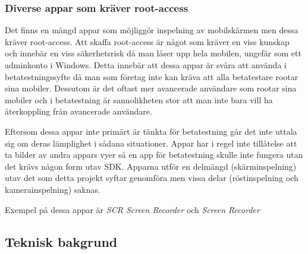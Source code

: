 \subsubsection{Diverse appar som kräver root-access}
\label{rootacc}
Det finns en mängd appar som möjliggör inspelning av mobilskärmen men dessa kräver root-access. Att skaffa root-access är något som kräver en viss kunskap och innebär en viss säkerhetsrisk då man låser upp hela mobilen, ungefär som ett adminkonto i Windows. Detta innebär att dessa appar är svåra att använda i betatestningssyfte då man som företag inte kan kräva att alla betatestare rootar sina mobiler. Dessutom är det oftast mer avancerade användare som rootar sina mobiler och i betatestning är sannolikheten stor att man inte bara vill ha återkoppling från avancerade användare. 

Eftersom dessa appar inte primärt är tänkta för betatestning går det inte uttala sig om deras lämplighet i sådana situationer. Appar har i regel inte tillåtelse att ta bilder av andra appars vyer så en app för betatestning skulle inte fungera utan det krävs någon form utav SDK. Apparna utför en delmängd (skärminspelning) utav det som detta projekt syftar genomföra men vissa delar (röstinspelning och kamerainspelning) saknas.

 Exempel på dessa appar är \emph{SCR Screen Recorder} \parencite{scr} och \emph{Screen Recorder} \parencite{sr}

\subsection{Teknisk bakgrund}
